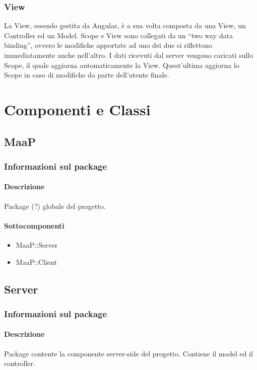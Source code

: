 \subsubsection{View}
La View, essendo gestita da Angular, è a sua volta composta da una View, un Controller ed un Model. Scope e View sono collegati da un “two way data binding”, ovvero le modifiche apportate ad uno dei due si riflettono immediatamente anche nell’altro.
I dati ricevuti dal server vengono caricati sullo Scope, il quale aggiorna automaticamente la View. Quest’ultima aggiorna lo Scope in caso di modifiche da parte dell’utente finale.

\newpage
\section{Componenti e Classi}

\subsection{MaaP}
\subsubsection{Informazioni sul package}
\paragraph{Descrizione}
Package (?) globale del progetto. 

\paragraph{Sottocomponenti}
\begin{itemize}
\item MaaP::Server
\item MaaP::Client
\end{itemize}

\subsection{Server}
\subsubsection{Informazioni sul package}
\paragraph{Descrizione}
Package contente la componente server-side del progetto. Contiene il model ed il controller.

